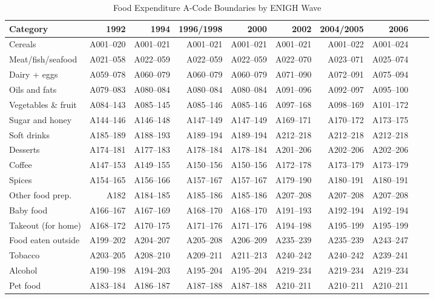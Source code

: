\begin{table}[h!]
\centering
\caption{Food Expenditure A-Code Boundaries by ENIGH Wave}
\label{tab:food_acodes}
\scriptsize
\begin{tabular}{lrrrrrrrrr}
\hline\hline
Category & 1992 & 1994 & 1996/1998 & 2000 & 2002 & 2004/2005 & 2006 \\
\hline
Cereals              & A001--020 & A001--021 & A001--021 & A001--021 & A001--021 & A001--022 & A001--024 \\
Meat/fish/seafood    & A021--058 & A022--059 & A022--059 & A022--059 & A022--070 & A023--071 & A025--074 \\
Dairy + eggs         & A059--078 & A060--079 & A060--079 & A060--079 & A071--090 & A072--091 & A075--094 \\
Oils and fats        & A079--083 & A080--084 & A080--084 & A080--084 & A091--096 & A092--097 & A095--100 \\
Vegetables \& fruit  & A084--143 & A085--145 & A085--146 & A085--146 & A097--168 & A098--169 & A101--172 \\
Sugar and honey      & A144--146 & A146--148 & A147--149 & A147--149 & A169--171 & A170--172 & A173--175 \\
Soft drinks          & A185--189 & A188--193 & A189--194 & A189--194 & A212--218 & A212--218 & A212--218 \\
Desserts             & A174--181 & A177--183 & A178--184 & A178--184 & A201--206 & A202--206 & A202--206 \\
Coffee               & A147--153 & A149--155 & A150--156 & A150--156 & A172--178 & A173--179 & A173--179 \\
Spices               & A154--165 & A156--166 & A157--167 & A157--167 & A179--190 & A180--191 & A180--191 \\
Other food prep.     & A182      & A184--185 & A185--186 & A185--186 & A207--208 & A207--208 & A207--208 \\
Baby food            & A166--167 & A167--169 & A168--170 & A168--170 & A191--193 & A192--194 & A192--194 \\
Takeout (for home)   & A168--172 & A170--175 & A171--176 & A171--176 & A194--198 & A195--199 & A195--199 \\
Food eaten outside   & A199--202 & A204--207 & A205--208 & A206--209 & A235--239 & A235--239 & A243--247 \\
Tobacco              & A203--205 & A208--210 & A209--211 & A211--213 & A240--242 & A240--242 & A239--241 \\
Alcohol              & A190--198 & A194--203 & A195--204 & A195--204 & A219--234 & A219--234 & A219--234 \\
Pet food             & A183--184 & A186--187 & A187--188 & A187--188 & A210--211 & A210--211 & A210--211 \\
\hline\hline
\end{tabular}
\end{table}

